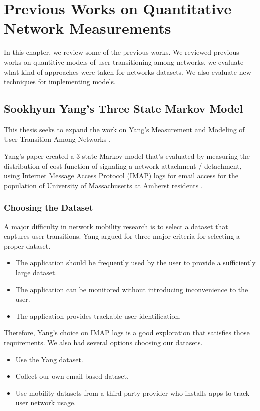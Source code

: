 \documentclass[]{article}
\begin{document}
\newpage

\section{Previous Works on Quantitative Network Measurements}
In this chapter, we review some of the previous works. We reviewed previous works on quantitive models of user transitioning among networks, we evaluate what kind of approaches were taken for networks datasets. We also evaluate new techniques for implementing models.

\subsection{Sookhyun Yang's Three State Markov Model}

This thesis seeks to expand the work on Yang's Measurement and Modeling of User Transition Among Networks \cite{yang}. 

Yang's paper created a 3-state Markov model that's evaluated by measuring the distribution of cost function of signaling a network attachment / detachment, using Internet Message Access Protocol (IMAP) logs for email access for the population of University of Massachusetts at Amherst residents \cite{yang}. 

\subsubsection{Choosing the Dataset}
A major difficulty in network mobility research is to select a dataset that captures user transitions. Yang argued for three major criteria for selecting a proper dataset\cite{yang}. 

\begin{itemize}
\item
The application should be frequently used by the user to provide a sufficiently large dataset.
\item
The application can be monitored without introducing inconvenience to the user.
\item
The application provides trackable user identification.
\end{itemize}

Therefore, Yang's choice on IMAP logs is a good exploration that satisfies those requirements. We also had several options choosing our datasets.

\begin{itemize}
\item
Use the Yang dataset.
\item
Collect our own email based dataset.
\item
Use mobility datasets from a third party provider who installs apps to track user network usage.
\end{itemize}
\end{document}
